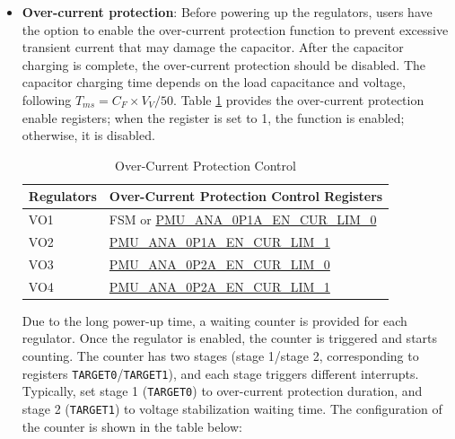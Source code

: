 \documentclass[main\_\_EN.tex]{subfiles}
\begin{document}
\begin{itemize}
\item \textbf{Over-current protection}: Before powering up the regulators, users have the option to enable the over-current protection function to prevent excessive transient current that may damage the capacitor. After the capacitor charging is complete, the over-current protection should be disabled. The capacitor charging time depends on the load capacitance and voltage, following $T_{ms} = C_{F} × V_{V}/50$. Table \ref{tab:lowpowm-vo-lim-prot} provides the over-current protection enable registers; when the register is set to 1, the function is enabled; otherwise, it is disabled.

    \begin{table}[H]
    \small
    \centering
    \caption{Over-Current Protection Control}
    \label{tab:lowpowm-vo-lim-prot}
    \begin{threeparttable}
    \begin{tabular}{|l|l|}
    \hline
    \rowcolor{lightgray}
    Regulators & Over-Current Protection Control Registers\\\hline

    VO1	& FSM or \hyperref[fielddesc:PMUANA0P1AENCURLIM0]{PMU\_ANA\_0P1A\_EN\_CUR\_LIM\_0} \\\hline

    VO2	& \hyperref[fielddesc:PMUANA0P1AENCURLIM1]{PMU\_ANA\_0P1A\_EN\_CUR\_LIM\_1}\\\hline

    VO3	& \hyperref[fielddesc:PMUANA0P2AENCURLIM0]{PMU\_ANA\_0P2A\_EN\_CUR\_LIM\_0}\\\hline

    VO4	& \hyperref[fielddesc:PMUANA0P2AENCURLIM1]{PMU\_ANA\_0P2A\_EN\_CUR\_LIM\_1}\\\hline
    \end{tabular}
    \end{threeparttable}
    \end{table}

Due to the long power-up time, a waiting counter is provided for each regulator. Once the regulator is enabled, the counter is triggered and starts counting. The counter has two stages (stage 1/stage 2, corresponding to registers \texttt{TARGET0}/\texttt{TARGET1}), and each stage triggers different interrupts. Typically, set stage 1 (\texttt{TARGET0}) to over-current protection duration, and stage 2 (\texttt{TARGET1}) to voltage stabilization waiting time. The configuration of the counter is shown in the table below:


\end{itemize}
\end{document}
